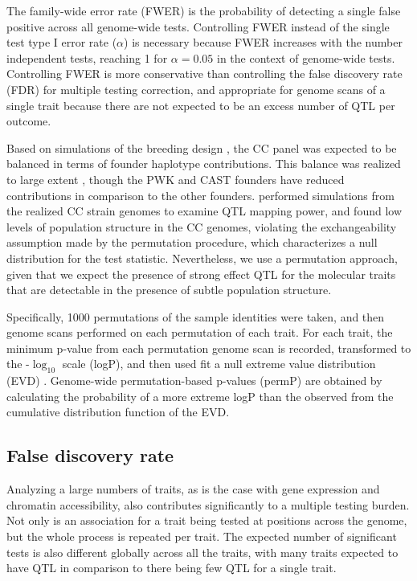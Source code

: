 \documentclass[9pt,twocolumn,twoside]{gsajnl}
\begin{document}
The family-wide error rate (FWER) is the probability of detecting a single false positive across all genome-wide tests. Controlling FWER instead of the single test type I error rate ($\alpha$) is necessary because FWER increases with the number independent tests, reaching 1 for $\alpha = 0.05$ in the context of genome-wide tests. Controlling FWER is more conservative than controlling the false discovery rate (FDR) for multiple testing correction, and appropriate for genome scans of a single trait because there are not expected to be an excess number of QTL per outcome. 

Based on simulations of the breeding design \citep{Valdar2006c}, the CC panel was expected to be balanced in terms of founder haplotype contributions. This balance was realized to large extent \citep{Srivastava2017}, though the PWK and CAST founders have reduced contributions in comparison to the other founders. \cite{KeeleSPARCC} performed simulations from the realized CC strain genomes to examine QTL mapping power, and found low levels of population structure in the CC genomes, violating the exchangeability assumption made by the permutation procedure, which characterizes a null distribution for the test statistic\citep{Doerge1996}. Nevertheless, we use a permutation approach, given that we expect the presence of strong effect QTL for the molecular traits that are detectable in the presence of subtle population structure.

Specifically, 1000 permutations of the sample identities were taken, and then genome scans performed on each permutation of each trait. For each trait, the minimum p-value from each permutation genome scan is recorded, transformed to the -$\log_{10}$ scale (logP), and then used fit a null extreme value distribution (EVD) \citep{Dudbridge2004,Valdar2006c}. Genome-wide permutation-based p-values (permP) are obtained by calculating the probability of a more extreme logP than the observed from the cumulative distribution function of the EVD.

\subsection{False discovery rate}

Analyzing a large numbers of traits, as is the case with gene expression and chromatin accessibility, also contributes significantly to a multiple testing burden. Not only is an association for a trait being tested at positions across the genome, but the whole process is repeated per trait. The expected number of significant tests is also different globally across all the traits, with many traits expected to have QTL in comparison to there being few QTL for a single trait. 
\end{document}
